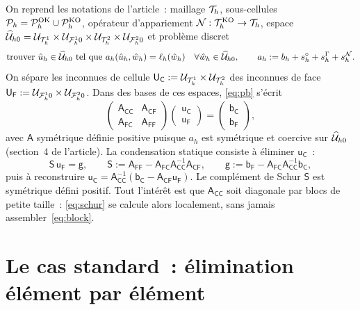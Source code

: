 \documentclass[11pt,a4paper]{article}
\theoremstyle{definition}
\theoremstyle{remark}
\newcommand{\A}{\mathsf{A}}
\newcommand{\B}{\mathsf{b}}
\newcommand{\Sm}{\mathsf{S}}
\newcommand{\U}{\mathsf{U}}
\begin{document}
On reprend les notations de l'article~: maillage $\mathcal{T}_h$, sous-cellules $\mathcal{P}_h=\mathcal{P}_h^{\textup{OK}}\cup\mathcal{P}_h^{\textup{KO}}$,
opérateur d'appariement $\mathcal{N}:\mathcal{T}_h^{\textup{KO}}\to\mathcal{T}_h$, espace $\widehat{\mathcal{U}}_{h0}=\mathcal{U}_{\mathcal{T}_h^1}\times\mathcal{U}_{\mathcal{F}_h^10}\times\mathcal{U}_{\mathcal{T}_h^2}\times\mathcal{U}_{\mathcal{F}_h^20}$
et problème discret
\begin{equation}\label{eq:pb}
\text{trouver } \hat{u}_h\in\widehat{\mathcal{U}}_{h0} \text{ tel que } a_h(\hat{u}_h,\hat{w}_h)=\ell_h(\hat{w}_h)\quad\forall\hat{w}_h\in\widehat{\mathcal{U}}_{h0},
\qquad a_h := b_h + s_h^\circ + s_h^\Gamma + s_h^{\mathcal{N}} .
\end{equation}
On sépare les inconnues de cellule $\U_\mathsf{C}:=\UTHone\times\UTHtwo$ des inconnues de face
$\U_\mathsf{F}:=\UFhonez\times\UFhtwoz$. Dans des bases de ces espaces, \eqref{eq:pb} s'écrit
\begin{equation}\label{eq:block}
\begin{pmatrix} \A_{\mathsf{CC}} & \A_{\mathsf{CF}} \\ \A_{\mathsf{FC}} & \A_{\mathsf{FF}} \end{pmatrix}
\begin{pmatrix} \mathsf{u}_\mathsf{C} \\ \mathsf{u}_\mathsf{F} \end{pmatrix}
= \begin{pmatrix} \B_\mathsf{C} \\ \B_\mathsf{F} \end{pmatrix},
\end{equation}
avec $\A$ symétrique définie positive puisque $a_h$ est symétrique et coercive sur $\widehat{\mathcal{U}}_{h0}$
(section~4 de l'article). La condensation statique consiste à éliminer $\mathsf{u}_\mathsf{C}$~:
\begin{equation}\label{eq:schur}
\Sm\,\mathsf{u}_\mathsf{F}=\mathsf{g}, \qquad
\Sm:=\A_{\mathsf{FF}}-\A_{\mathsf{FC}}\A_{\mathsf{CC}}^{-1}\A_{\mathsf{CF}},\qquad
\mathsf{g}:=\B_\mathsf{F}-\A_{\mathsf{FC}}\A_{\mathsf{CC}}^{-1}\B_\mathsf{C},
\end{equation}
puis à reconstruire $\mathsf{u}_\mathsf{C}=\A_{\mathsf{CC}}^{-1}(\B_\mathsf{C}-\A_{\mathsf{CF}}\mathsf{u}_\mathsf{F})$.
Le complément de Schur $\Sm$ est symétrique défini positif. Tout l'intérêt est que $\A_{\mathsf{CC}}$ soit
diagonale par blocs de petite taille~: \eqref{eq:schur} se calcule alors localement, sans jamais
assembler~\eqref{eq:block}.

\section{Le cas standard~: élimination élément par élément}
\end{document}
